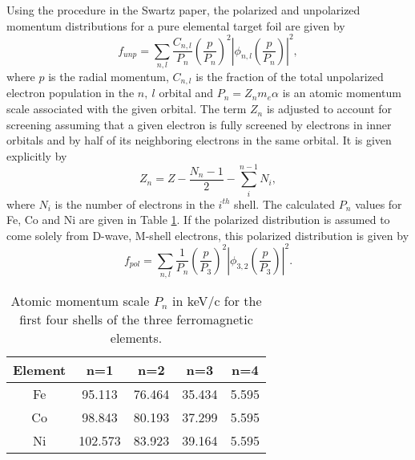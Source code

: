\documentclass[12pt]{article}
\begin{document}
Using the procedure in the Swartz paper\cite{Swartz1995}, the polarized and unpolarized momentum distributions for a pure elemental target foil are given by
\begin{equation}
f_{unp}=\sum_{n,l}\frac{C_{n,l}}{P_n}\left(\frac{p}{P_n}\right)^2\left|\phi_{n,l}\left(\frac{p}{P_n}\right)\right|^2,
\end{equation}
where $p$ is the radial momentum, $C_{n,l}$ is the fraction of the total unpolarized electron population in the $n,~l$ orbital and $P_n=Z_nm_e\alpha$ is an atomic momentum scale associated with the given orbital. The term $Z_n$ is adjusted to account for screening assuming that a given electron is fully screened by electrons in inner orbitals and by half of its neighboring electrons in the same orbital. It is given explicitly by
\[
Z_n=Z-\frac{N_n-1}{2}-\sum_i^{n-1}N_i,
\]
where $N_i$ is the number of electrons in the $i^{th}$ shell. The calculated $P_n$ values for Fe, Co and Ni are given in Table \ref{tab:pn}. If the polarized distribution is assumed to come solely from D-wave, M-shell electrons, this polarized distribution is given by
\[
f_{pol}=\sum_{n,l}\frac{1}{P_n}\left(\frac{p}{P_3}\right)^2\left|\phi_{3,2}\left(\frac{p}{P_3}\right)\right|^2.
\]

\begin{table}
	\centering
	\caption{\label{tab:pn}Atomic momentum scale $P_n$ in keV/c for the first four shells of the three ferromagnetic elements. }
	\begin{tabular}[h]{c|cccc}
		Element & n=1 & n=2 & n=3 & n=4\\\hline
		Fe & 95.113 & 76.464 & 35.434 & 5.595\\
		Co & 98.843 & 80.193 & 37.299 & 5.595\\
		Ni & 102.573 & 83.923 & 39.164 & 5.595\\
	\end{tabular}
\end{table}
 
%


\end{document}
